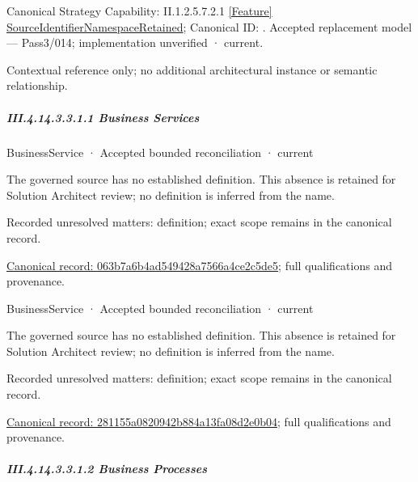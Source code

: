 {\small Canonical Strategy Capability: II.1.2.5.7.2.1 \hyperref[element:6c77e4aa99d6438c93a5df4720758414]{[Feature] SourceIdentifierNamespaceRetained}; Canonical ID: \texttt{}. Accepted replacement model — Pass3/014; implementation unverified · current.}\par
Contextual reference only; no additional architectural instance or semantic relationship.\par
\subparagraph*{III.4.14.3.3.1.1 Business Services}
\label{navigation:III.4.14.3.3.1.1}

\label{navigation:III.4.14.3.3.1.1.1}

\label{element:063b7a6b4ad549428a7566a4ce2c5de5}
{\small BusinessService · Accepted bounded reconciliation · current}\par

The governed source has no established definition. This absence is retained for Solution Architect review; no definition is inferred from the name.


{\small Recorded unresolved matters: definition; exact scope remains in the canonical record.}\par
{\footnotesize \href{../../../../../../../../continuum/business/business-service/063b7a6b4ad549428a7566a4ce2c5de5.md}{Canonical record: 063b7a6b4ad549428a7566a4ce2c5de5}; full qualifications and provenance.}\par
{}
\label{navigation:III.4.14.3.3.1.1.2}

\label{element:281155a0820942b884a13fa08d2e0b04}
{\small BusinessService · Accepted bounded reconciliation · current}\par

The governed source has no established definition. This absence is retained for Solution Architect review; no definition is inferred from the name.


{\small Recorded unresolved matters: definition; exact scope remains in the canonical record.}\par
{\footnotesize \href{../../../../../../../../continuum/business/business-service/281155a0820942b884a13fa08d2e0b04.md}{Canonical record: 281155a0820942b884a13fa08d2e0b04}; full qualifications and provenance.}\par
\subparagraph*{III.4.14.3.3.1.2 Business Processes}
\label{navigation:III.4.14.3.3.1.2}

